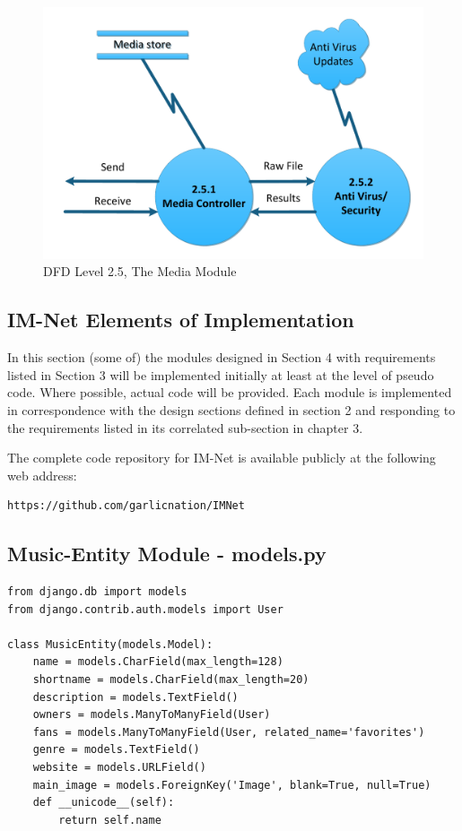 \documentclass[letterpaper,12pt]{article}
\newcommand{\Section}[1]{\section{#1} \setcounter{figure}{0}}
\begin{document}
{\eject

\begin{figure}[h]
\centering
\includegraphics[scale=0.7]{DFD_level_2_5.pdf}
\caption{DFD Level 2.5, The Media Module}
\label{fig:DFD_level_2.5, The Media Module}
\end{figure}

\eject
 
\textcolor{section}{\Section{IM-Net Elements of Implementation}}

In this section (some of) the modules designed in Section 4 with requirements listed in Section 3 will be implemented initially at least at the level of pseudo code. Where possible, actual code will be provided. Each module is implemented in correspondence with the design sections defined in section 2 and responding to the requirements listed in its correlated sub-section in chapter 3.

The complete code repository for IM-Net is available publicly at the following web address: 
\begin{verbatim}
https://github.com/garlicnation/IMNet
\end{verbatim}

\textcolor{subsection}{\subsection{Music-Entity Module - models.py}}
\begin{verbatim}
from django.db import models
from django.contrib.auth.models import User

class MusicEntity(models.Model):
    name = models.CharField(max_length=128)
    shortname = models.CharField(max_length=20)
    description = models.TextField()
    owners = models.ManyToManyField(User)
    fans = models.ManyToManyField(User, related_name='favorites')
    genre = models.TextField()
    website = models.URLField()
    main_image = models.ForeignKey('Image', blank=True, null=True)
    def __unicode__(self):
        return self.name


\end{verbatim}}
\end{document}
